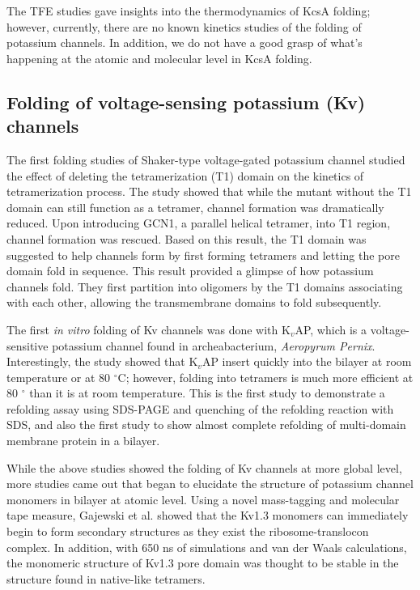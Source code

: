 The TFE studies gave insights into the thermodynamics of KcsA folding; however, currently, there are no known kinetics studies of the folding of potassium channels. In addition, we do not have a good grasp of what's happening at the atomic and molecular level in KcsA folding.

\subsection{Folding of voltage-sensing potassium (Kv) channels}
The first folding studies of Shaker-type voltage-gated potassium channel studied the effect of deleting the tetramerization (T1) domain on the kinetics of tetramerization process. \cite{zerangue2000} The study showed that while the mutant without the T1 domain can still function as a tetramer, channel formation was dramatically reduced. Upon introducing GCN1, a parallel helical tetramer, into T1 region, channel formation was rescued. Based on this result, the T1 domain was suggested to help channels form by first forming tetramers and letting the pore domain fold in sequence. This result provided a glimpse of how potassium channels fold. They first partition into oligomers by the T1 domains associating with each other, allowing the transmembrane domains to fold subsequently. 

The first \textit{in vitro} folding of Kv channels was done with K$_{v}$AP, which is a voltage-sensitive potassium channel found in archeabacterium, \textit{Aeropyrum Pernix}. \cite{devaraneni2011} Interestingly, the study showed that K$_{v}$AP insert quickly into the bilayer at room temperature or at 80 $^{\circ}$C; however, folding into tetramers is much more efficient at 80 $^{\circ}$ than it is at room temperature. This is the first study to demonstrate a refolding assay using SDS-PAGE and quenching of the refolding reaction with SDS, and also the first study to show almost complete refolding of multi-domain membrane protein in a bilayer.

While the above studies showed the folding of Kv channels at more global level, more studies came out that began to elucidate the structure of potassium channel monomers in bilayer at atomic level. Using a novel mass-tagging and molecular tape measure, Gajewski et al. showed that the Kv1.3 monomers can immediately begin to form secondary structures as they exist the ribosome-translocon complex. In addition, with 650 ns of simulations and van der Waals calculations, the monomeric structure of Kv1.3 pore domain was thought to be stable in the structure found in native-like tetramers.

